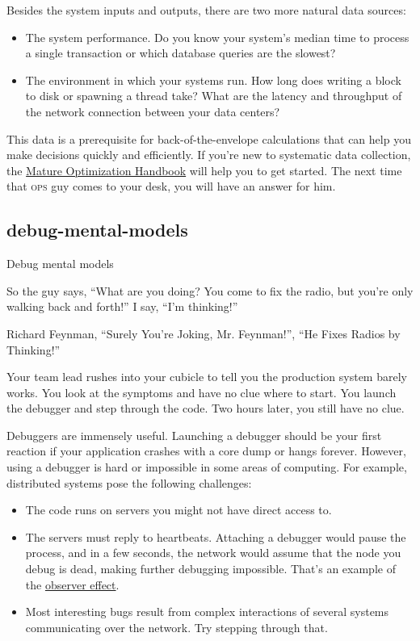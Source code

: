 \documentclass{article}
\begin{document}
Besides the system inputs and outputs, there are two more natural data sources:
\begin{itemize}
\item The system performance.
Do you know your system's median time to process a single transaction or which database queries are the slowest?
\item The environment in which your systems run.
How long does writing a block to disk or spawning a thread take?
What are the latency and throughput of the network connection between your data centers?
\end{itemize}

This data is a prerequisite for back-of-the-envelope calculations that can help you make decisions quickly and efficiently.
If you're new to systematic data collection,
the \href{https://carlos.bueno.org/optimization/}{Mature Optimization Handbook} will help you to get started.
The next time that \textsc{ops} guy comes to your desk,
you will have an answer for him.

\subsection{debug-mental-models}{Debug mental models}
\epigraph{
    So the guy says, ``What are you doing? You come to fix the radio, but you're only walking back and forth!''
    I say, ``I'm thinking!''
}{Richard Feynman, ``Surely You're Joking, Mr. Feynman!'', ``He Fixes Radios by Thinking!''}

Your team lead rushes into your cubicle to tell you the production system barely works.
You look at the symptoms and have no clue where to start.
You launch the debugger and step through the code.
Two hours later, you still have no clue.

Debuggers are immensely useful.
Launching a debugger should be your first reaction if your application crashes with a core dump or hangs forever.
However, using a debugger is hard or impossible in some areas of computing.
For example, distributed systems pose the following challenges:
\begin{itemize}
\item The code runs on servers you might not have direct access to.
\item The servers must reply to heartbeats.
Attaching a debugger would pause the process, and in a few seconds, the network would assume that the node you debug is dead, making further debugging impossible.
That's an example of the \href{https://en.wikipedia.org/wiki/Observer_effect_(physics)}{observer effect}.
\item
Most interesting bugs result from complex interactions of several systems communicating over the network.
Try stepping through that.
\end{itemize}
\end{document}
